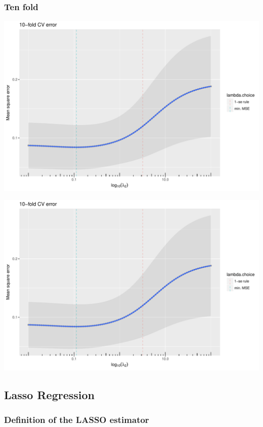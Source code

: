\documentclass{beamer}\usepackage[]{graphicx}\usepackage[]{color}
\newenvironment{knitrout}{}{} %
\begin{document}
\begin{frame}[containsverbatim]
  \frametitle{Ten fold}
\begin{knitrout}\scriptsize
{}\color{fgcolor}
\includegraphics[width=.8\textwidth]{figures/plot_cv10_ridge-1} 

\includegraphics[width=.8\textwidth]{figures/plot_cv10_ridge-2} 

\end{knitrout}
\end{frame}





\subsection{Lasso Regression}

\subsubsection{Definition of the LASSO estimator}
\end{document}
